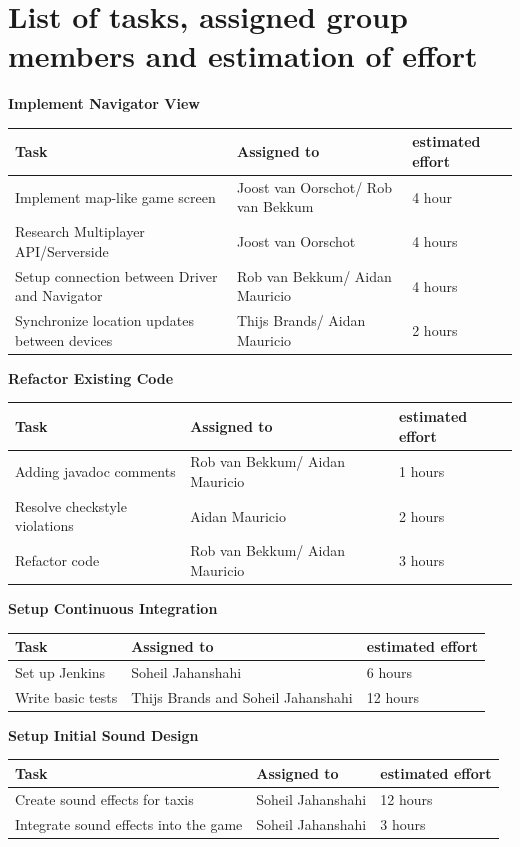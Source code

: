 \documentclass{article}
\begin{document}
\section*{List of tasks, assigned group members and estimation of effort}
\textbf{Implement Navigator View} \\
\begin{tabular}{ | l | l | l | }
\hline
\textbf{Task} & \textbf{Assigned to} & \textbf{estimated effort} \\ \hline
Implement map-like game screen & Joost van Oorschot/ Rob van Bekkum & 4 hour \\ \hline
Research Multiplayer API/Serverside & Joost van Oorschot & 4 hours \\ \hline
Setup connection between Driver and Navigator & Rob van Bekkum/ Aidan Mauricio & 4 hours \\ \hline
Synchronize location updates between devices & Thijs Brands/ Aidan Mauricio & 2 hours \\ \hline
\end{tabular} \newline
\newline
\textbf{Refactor Existing Code} \\
\begin{tabular}{ | l | l | l | }
\hline
\textbf{Task} & \textbf{Assigned to} & \textbf{estimated effort} \\ \hline
Adding javadoc comments & Rob van Bekkum/ Aidan Mauricio & 1 hours \\ \hline
Resolve checkstyle violations & Aidan Mauricio & 2 hours \\ \hline
Refactor code & Rob van Bekkum/ Aidan Mauricio& 3 hours \\ \hline
\end{tabular} \newline
\newline
\textbf{Setup Continuous Integration} \\
\begin{tabular}{ | l | l | l | }
\hline
\textbf{Task} & \textbf{Assigned to} & \textbf{estimated effort} \\ \hline
Set up Jenkins & Soheil Jahanshahi & 6 hours \\ \hline
Write basic tests & Thijs Brands and Soheil Jahanshahi & 12 hours \\ \hline
\end{tabular} \newline
\newline
\textbf{Setup Initial Sound Design} \\
\begin{tabular}{ | l | l | l | }
\hline
\textbf{Task} & \textbf{Assigned to} & \textbf{estimated effort} \\ \hline
Create sound effects for taxis & Soheil Jahanshahi & 12 hours \\ \hline
Integrate sound effects into the game & Soheil Jahanshahi & 3 hours \\ \hline
\end{tabular} \newline
\newline
\end{document}

